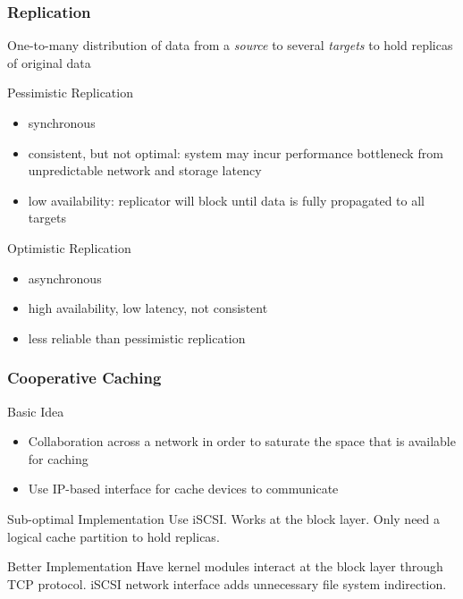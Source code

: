\begin{frame}
    \frametitle{Replication}
    One-to-many distribution of data from a \textit{source}
    to several \textit{targets} to hold replicas of original data
    \begin{block}{Pessimistic Replication}
	\begin{itemize}
	    \item synchronous
	    \item consistent, but not optimal: system may incur
		performance bottleneck from unpredictable network
		and storage latency
	    \item low availability: replicator will block until data is
		fully propagated to all targets
	\end{itemize}
    \end{block}
    \begin{block}{Optimistic Replication}
	\begin{itemize}
	    \item asynchronous
	    \item high availability, low latency, not consistent
	    \item less reliable than pessimistic replication
	\end{itemize}
    \end{block}
\end{frame}
\begin{frame}
    \frametitle{Cooperative Caching}
    \begin{block}{Basic Idea}
    	\begin{itemize}
	    \item Collaboration across a network in order to saturate
		the space that is available for caching
	    \item Use IP-based interface for cache devices to communicate
	\end{itemize}
    \end{block}
    \begin{block}{Sub-optimal Implementation}
	Use iSCSI. Works at the block layer. Only need a logical cache
	partition to hold replicas.
    \end{block}
    \begin{block}{Better Implementation}
	Have kernel modules interact at the block layer through TCP
	protocol. iSCSI network interface adds unnecessary file system
	indirection.
    \end{block}
\end{frame}
